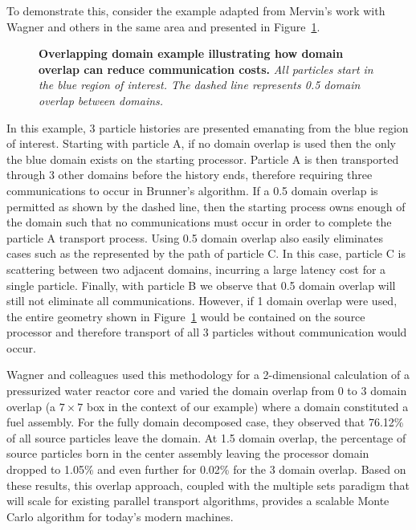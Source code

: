 To demonstrate this, consider the example adapted from Mervin's work
with Wagner and others in the same area \citep{mervin_variance_2012}
and presented in Figure~\ref{fig:msod_example}.
\begin{figure}[t!]
  \begin{center}
    \scalebox{1.5}{
       }
  \end{center}
  \caption{\textbf{Overlapping domain example illustrating how domain
      overlap can reduce communication costs.}
    \textit{All particles start in the blue region of interest. The
      dashed line represents 0.5 domain overlap between domains.}}
  \label{fig:msod_example}
\end{figure}
In this example, 3 particle histories are presented emanating from the
blue region of interest. Starting with particle A, if no domain
overlap is used then the only the blue domain exists on the starting
processor. Particle A is then transported through 3 other domains
before the history ends, therefore requiring three communications to
occur in Brunner's algorithm. If a 0.5 domain overlap is permitted as
shown by the dashed line, then the starting process owns enough of the
domain such that no communications must occur in order to complete the
particle A transport process. Using 0.5 domain overlap also easily
eliminates cases such as the represented by the path of particle C. In
this case, particle C is scattering between two adjacent domains,
incurring a large latency cost for a single particle. Finally, with
particle B we observe that 0.5 domain overlap will still not eliminate
all communications. However, if 1 domain overlap were used, the entire
geometry shown in Figure~\ref{fig:msod_example} would be contained on
the source processor and therefore transport of all 3 particles
without communication would occur.

Wagner and colleagues used this methodology for a 2-dimensional
calculation of a pressurized water reactor core and varied the domain
overlap from 0 to 3 domain overlap (a $7 \times 7$ box in the context
of our example) where a domain constituted a fuel assembly. For the
fully domain decomposed case, they observed that 76.12\% of all source
particles leave the domain. At 1.5 domain overlap, the percentage of
source particles born in the center assembly leaving the processor
domain dropped to 1.05\% and even further for 0.02\% for the 3 domain
overlap. Based on these results, this overlap approach, coupled with
the multiple sets paradigm that will scale for existing parallel
transport algorithms, provides a scalable Monte Carlo algorithm for
today's modern machines.

